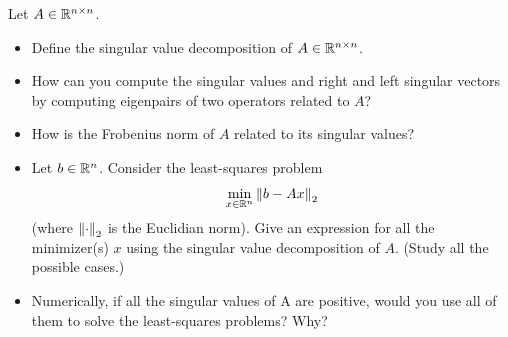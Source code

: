\documentclass[10pt]{article}
\begin{document}
\maketitle

\pagebreak
\tableofcontents

\begin{problem}
Let \( A\in\mathbb{R}^{n\times n} \).
\begin{itemize}[nolistsep]
    \item Define the singular value decomposition of \( A\in\mathbb{R}^{n\times n} \).
    \item How can you compute the singular values and right and left singular vectors by computing eigenpairs of two operators related to \( A \)?
    \item How is the Frobenius norm of \( A \) related to its singular values?
    \item Let \( b\in \mathbb{R}^n \). Consider the least-squares problem
    \begin{align*}
        \min_{x\in\mathbb{R}^n} \left\lVert b-Ax\right\rVert_2
    \end{align*}
    (where \( \left\lVert\cdot\right\rVert_2 \) is the Euclidian norm). Give an expression for all the minimizer(s) \( x \) using the singular value decomposition of \( A \). (Study all the possible cases.)
        \item Numerically, if all the singular values of A are positive, would you use all of them to solve the least-squares problems? Why?
\end{itemize}
\end{problem}
\end{document}
